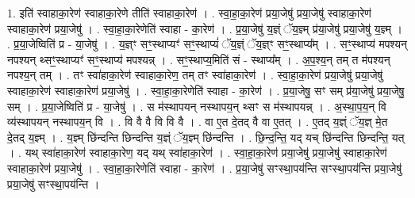 \documentclass[17pt]{extarticle}
\begin{document}
1. इति॑ स्वाहाका॒रेण॑ स्वाहाका॒रेणे तीति॑ स्वाहाका॒रेण॑ । . स्वा॒हा॒का॒रेण॑ प्रया॒जेषु॑ प्रया॒जेषु॑ स्वाहाका॒रेण॑ स्वाहाका॒रेण॑ प्रया॒जेषु॑ । . स्वा॒हा॒का॒रेणेति॑ स्वाहा - का॒रेण॑ । . प्र॒या॒जेषु॑ य॒ज्ञ्ं ॅय॒ज्ञ्म् प्र॑या॒जेषु॑ प्रया॒जेषु॑ य॒ज्ञ्म् । . प्र॒या॒जेष्विति॑ प्र - या॒जेषु॑ । . य॒ज्ञ्ꣳ सꣳ॒॒स्थाप्यꣳ॑ सꣳ॒॒स्थाप्यं॑ ॅय॒ज्ञ्ं ॅय॒ज्ञ्ꣳ सꣳ॒॒स्थाप्य᳚म् । . सꣳ॒॒स्थाप्य॑ मपश्यन् नपश्यन् थ्सꣳ॒॒स्थाप्यꣳ॑ सꣳ॒॒स्थाप्य॑ मपश्यन्न् । . सꣳ॒॒स्थाप्य॒मिति॑ सं - स्थाप्य᳚म् । . अ॒प॒श्य॒न् तम् त म॑पश्यन् नपश्य॒न् तम् । . तꣳ स्वा॑हाका॒रेण॑ स्वाहाका॒रेण॒ तम् तꣳ स्वा॑हाका॒रेण॑ । . स्वा॒हा॒का॒रेण॑ प्रया॒जेषु॑ प्रया॒जेषु॑ स्वाहाका॒रेण॑ स्वाहाका॒रेण॑ प्रया॒जेषु॑ । . स्वा॒हा॒का॒रेणेति॑ स्वाहा - का॒रेण॑ । . प्र॒या॒जेषु॒ सꣳ सम् प्र॑या॒जेषु॑ प्रया॒जेषु॒ सम् । . प्र॒या॒जेष्विति॑ प्र - या॒जेषु॑ । . स म॑स्थापयन् नस्थापय॒न् थ्सꣳ स म॑स्थापयन्न् । . अ॒स्था॒प॒य॒न् वि व्य॑स्थापयन् नस्थापय॒न् वि । . वि वै वै वि वि वै । . वा ए॒त दे॒तद् वै वा ए॒तत् । . ए॒तद् य॒ज्ञ्ं ॅय॒ज्ञ् मे॒त दे॒तद् य॒ज्ञ्म् । . य॒ज्ञ्म् छि॑न्दन्ति छिन्दन्ति य॒ज्ञ्ं ॅय॒ज्ञ्म् छि॑न्दन्ति । . छि॒न्द॒न्ति॒ यद् यच् छि॑न्दन्ति छिन्दन्ति॒ यत् । . यथ् स्वा॑हाका॒रेण॑ स्वाहाका॒रेण॒ यद् यथ् स्वा॑हाका॒रेण॑ । . स्वा॒हा॒का॒रेण॑ प्रया॒जेषु॑ प्रया॒जेषु॑ स्वाहाका॒रेण॑ स्वाहाका॒रेण॑ प्रया॒जेषु॑ । . स्वा॒हा॒का॒रेणेति॑ स्वाहा - का॒रेण॑ । . प्र॒या॒जेषु॑ सꣳस्था॒पय॑न्ति सꣳस्था॒पय॑न्ति प्रया॒जेषु॑ प्रया॒जेषु॑ सꣳस्था॒पय॑न्ति । \newline
\end{document}
